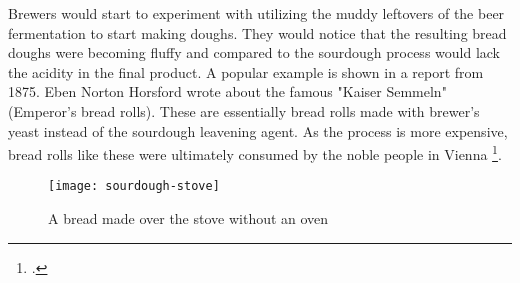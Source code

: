 Brewers would start to experiment with utilizing the muddy leftovers
of the beer fermentation to start making doughs. They would notice
that the resulting bread doughs were becoming fluffy and compared
to the sourdough process would lack the acidity in the final product.
A popular example is shown in a report from 1875. Eben Norton Horsford
wrote about the famous "Kaiser Semmeln" (Emperor's bread rolls).
These are essentially bread rolls made with brewer's yeast instead
of the sourdough leavening agent. As the process is more expensive,
bread rolls like these were ultimately consumed by the noble people
in Vienna \footcite{vienna+breadrolls}.

\begin{figure}[h]
  \texttt{[image: sourdough-stove]}
  \caption{A bread made over the stove without an oven}
  \label{sourdough-stove}
\end{figure}

